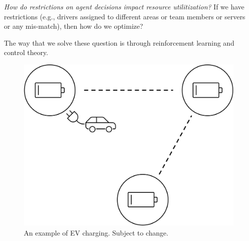 \documentclass[letterpaper, 10 pt, conference]{ieeeconf}
\begin{document}
\noindent\textit{How do restrictions on agent decisions impact resource utilitization?} If we have restrictions (e.g.,  drivers assigned to different areas or team members or servers or any mis-match), then how do we optimize?

The way that we solve these question is through reinforcement learning and control theory.

\begin{figure}
    \centering
    \includegraphics[width=0.8\columnwidth]{EV.png}
    \caption{An example of EV charging. Subject to change.}
    \label{fig:app}
\end{figure}
\end{document}
